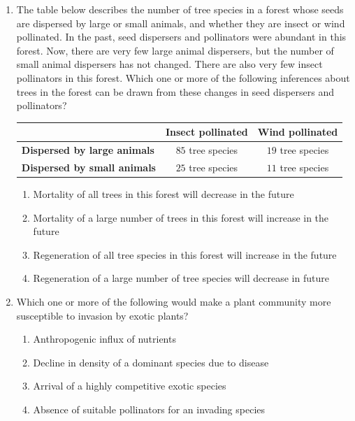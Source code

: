 \documentclass[journal]{IEEEtran}
\begin{document}
\begin{enumerate}
    \item The table below describes the number of tree species in a forest whose seeds are dispersed 
by large or small animals, and whether they are insect or wind pollinated.
In the past, seed dispersers and pollinators were abundant in this forest.
Now, there are very few large animal dispersers, but the number of small animal dispersers has not changed.
There are also very few insect pollinators in this forest.
Which one or more of the following inferences about trees in the forest can be drawn from these changes in seed dispersers and pollinators?
\begin{center}
    \begin{tabular}{|l|c|c|}
    \hline
    & \textbf{Insect pollinated} & \textbf{Wind pollinated} \\ \hline
    \textbf{Dispersed by large animals} & $85$ tree species & $19$ tree species \\ \hline
    \textbf{Dispersed by small animals} & $25$ tree species & $11$ tree species \\ \hline
    \end{tabular}
    \end{center}
    \begin{enumerate}
        \item Mortality of all trees in this forest will decrease in the future
        \item Mortality of a large number of 
trees in this forest will increase in the future
        \item Regeneration of all tree species in this forest will increase in the future
        \item Regeneration of a large number of tree species will decrease in future
    \end{enumerate}

    \item Which one or more of the following would make a plant community more susceptible to invasion by exotic plants?
\begin{enumerate}
        \item Anthropogenic influx of nutrients
        \item Decline in density of a dominant species due to disease
        \item Arrival of a highly competitive exotic species
        \item Absence of suitable pollinators for an invading species
    \end{enumerate}
    

\end{enumerate}
\end{document}
